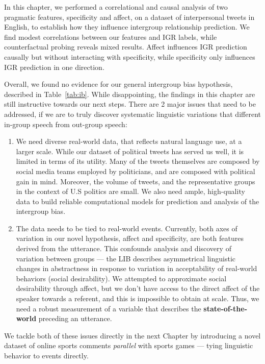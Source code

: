 In this chapter, we performed a correlational and causal analysis of two pragmatic features, specificity and affect, on a dataset of interpersonal tweets in English, to establish how they influence intergroup relationship prediction. We find modest correlations between our features and IGR labels, while counterfactual probing reveals mixed results. Affect influences IGR prediction causally but without interacting with specificity, while specificity only influences IGR prediction in one direction. 

Overall, we found no evidence for our general intergroup bias hypothesis, described in Table~\ref{tab:ib}. While disappointing, the findings in this chapter are still instructive towards our next steps. There are 2 major issues that need to be addressed, if we are to truly discover systematic linguistic variations that different in-group speech from out-group speech:

\begin{enumerate}
    \item We need diverse real-world data, that reflects natural language use, at a larger scale. While our dataset of political tweets has served us well, it is limited in terms of its utility. Many of the tweets themselves are composed by social media teams employed by politicians, and are composed with political gain in mind. Moreover, the volume of tweets, and the representative groups in the context of U.S politics are small. We also need ample, high-quality data to build reliable computational models for prediction and analysis of the intergroup bias.
    \item The data needs to be tied to real-world events. Currently, both axes of variation in our novel hypothesis, affect and specificity, are both features derived from the utterance. This confounds analysis and discovery of variation between groups --- the LIB describes asymmetrical linguistic changes in abstractness in response to variation in acceptability of real-world behaviors (social desirability). We attempted to approximate social desirability through affect, but we don't have access to the direct affect of the speaker towards a referent, and this is impossible to obtain at scale. Thus, we need a robust measurement of a variable that describes the \textbf{state-of-the-world} preceding an utterance.
\end{enumerate}

We tackle both of these issues directly in the next Chapter by introducing a novel dataset of online sports comments \emph{parallel} with sports games --- tying linguistic behavior to events directly. 
